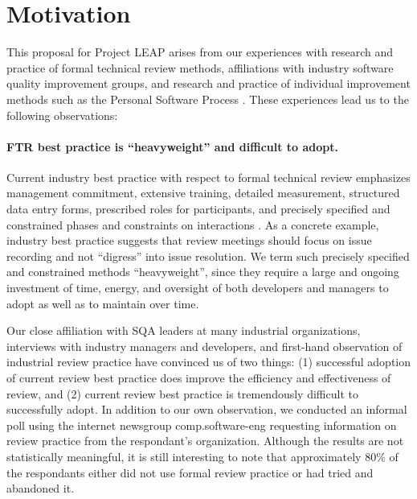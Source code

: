 

\section{Motivation}

This proposal for Project LEAP arises from our experiences with research and
practice of formal technical review methods, affiliations with industry
software quality improvement groups, and research and practice of
individual improvement methods such as the Personal Software Process \cite{Humphrey95}.
These experiences lead us to the following observations:

\paragraph{FTR best practice is ``heavyweight'' and difficult to adopt.} 
Current industry best practice with respect to formal technical review
emphasizes management commitment, extensive training, detailed measurement,
structured data entry forms, prescribed roles for participants, and
precisely specified and constrained phases and constraints on interactions
\cite{Freedman90,Gilb93,Strauss94,Wheeler96}.  As a concrete example,
industry best practice suggests that review meetings should focus on issue
recording and not ``digress'' into issue resolution.  We term such precisely
specified and constrained methods ``heavyweight'', since they require a
large and ongoing investment of time, energy, and oversight of both
developers and managers to adopt as well as to maintain over time.

Our close affiliation with SQA leaders at many industrial organizations,
interviews with industry managers and developers, and first-hand
observation of industrial review practice have convinced us of two things:
(1) successful adoption of current review best practice does improve the
efficiency and effectiveness of review, and (2) current review best
practice is tremendously difficult to successfully adopt.  In addition to
our own observation, we conducted an informal poll using the internet
newsgroup comp.software-eng requesting information on review practice from
the respondant's organization.  Although the results are not statistically
meaningful, it is still interesting to note that approximately 80\% of the
respondants either did not use formal review practice or had tried and
abandoned it.


